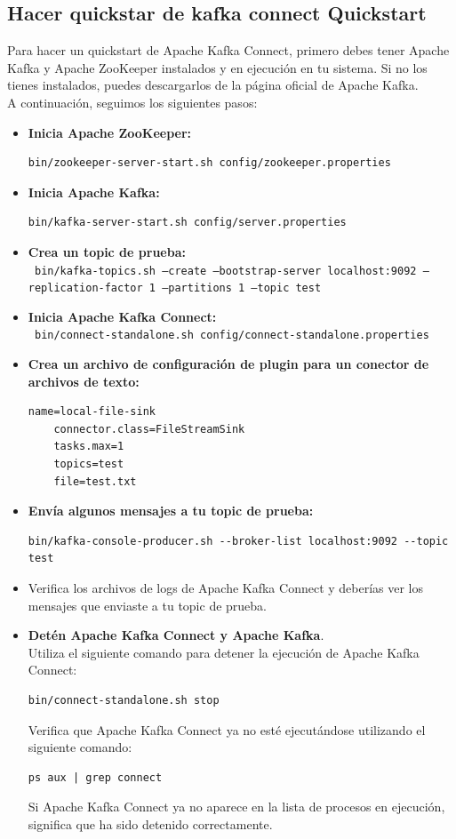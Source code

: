 \documentclass{article}
\begin{document}
\subsection{Hacer quickstar de kafka connect Quickstart}
Para hacer un quickstart de Apache Kafka Connect, primero debes tener Apache Kafka y Apache ZooKeeper instalados y en ejecución en tu sistema. Si no los tienes instalados, puedes descargarlos de la página oficial de Apache Kafka.\\
A continuación, seguimos los siguientes pasos:
\begin{itemize}
    \item \textbf{Inicia Apache ZooKeeper:}
    \begin{lstlisting}[numbers=none]
    bin/zookeeper-server-start.sh config/zookeeper.properties\end{lstlisting}
    \item \textbf{Inicia Apache Kafka:}
    \begin{lstlisting}[numbers=none]
    bin/kafka-server-start.sh config/server.properties\end{lstlisting}
    \item \textbf{Crea un topic de prueba:}\\
        \texttt{
        bin/kafka-topics.sh --create --bootstrap-server localhost:9092 --replication-factor 1 --partitions 1 --topic test}
        \item \textbf{Inicia Apache Kafka Connect:}\\
        \texttt{
        bin/connect-standalone.sh config/connect-standalone.properties}
    \item \textbf{Crea un archivo de configuración de plugin para un conector de archivos de texto:}
    \begin{lstlisting}[numbers=none]
    name=local-file-sink
    connector.class=FileStreamSink
    tasks.max=1
    topics=test
    file=test.txt\end{lstlisting}
    \item \textbf{Envía algunos mensajes a tu topic de prueba:}
    \begin{lstlisting}[numbers=none]
    bin/kafka-console-producer.sh --broker-list localhost:9092 --topic test\end{lstlisting}
    \item Verifica los archivos de logs de Apache Kafka Connect y deberías ver los mensajes que enviaste a tu topic de prueba.
    \item \textbf{Detén Apache Kafka Connect y Apache Kafka}.\\
    Utiliza el siguiente comando para detener la ejecución de Apache Kafka Connect:
    \begin{lstlisting}[numbers=none]
    bin/connect-standalone.sh stop\end{lstlisting}
    Verifica que Apache Kafka Connect ya no esté ejecutándose utilizando el siguiente comando:
    \begin{lstlisting}[numbers=none]
    ps aux | grep connect\end{lstlisting}
    Si Apache Kafka Connect ya no aparece en la lista de procesos en ejecución, significa que ha sido detenido correctamente.
\end{itemize}
\end{document}
